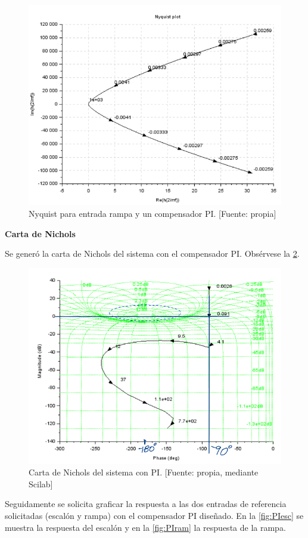 \documentclass[12pt,letterpaper]{article}
\begin{document}
\begin{figure}[hbtp]
	\centering
	\includegraphics[width = .7 \columnwidth]{8b.png} 
	\caption[Figura7]{Nyquist para entrada rampa y un compensador PI. [Fuente: propia]} 
	\label{fig:fig12} 
\end{figure}

\bigskip

\textbf{Carta de Nichols}

Se generó la carta de Nichols del sistema con el compensador PI. Obsérvese la \ref{fig:NycholsPI}.

\begin{figure}[hbtp]
	\centering
	\includegraphics[width = 0.7 \columnwidth]{nicholsPI.png} 
	\caption[Figura7]{Carta de Nichols del sistema con PI. [Fuente: propia, mediante Scilab]} 
	\label{fig:NycholsPI} 
\end{figure}

\bigskip

Seguidamente se solicita graficar la respuesta a las dos entradas de referencia solicitadas (escalón y rampa) con el compensador PI diseñado. En la \ref{fig:PIesc} se muestra la respuesta del escalón y en la \ref{fig:PIram} la respuesta de la rampa.
\end{document}
